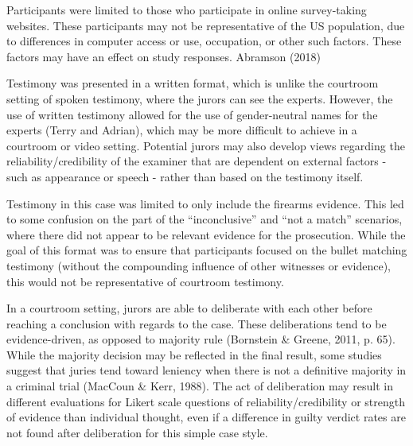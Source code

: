 \documentclass[print]{nuthesis}
\begin{document}
Participants were limited to those who participate in online survey-taking websites.
These participants may not be representative of the US population, due to differences in computer access or use, occupation, or other such factors.
These factors may have an effect on study responses.
Abramson (2018) 

Testimony was presented in a written format, which is unlike the courtroom setting of spoken testimony, where the jurors can see the experts.
However, the use of written testimony allowed for the use of gender-neutral names for the experts (Terry and Adrian), which may be more difficult to achieve in a courtroom or video setting.
Potential jurors may also develop views regarding the reliability/credibility of the examiner that are dependent on external factors - such as appearance or speech - rather than based on the testimony itself.

Testimony in this case was limited to only include the firearms evidence.
This led to some confusion on the part of the ``inconclusive'' and ``not a match'' scenarios, where there did not appear to be relevant evidence for the prosecution.
While the goal of this format was to ensure that participants focused on the bullet matching testimony (without the compounding influence of other witnesses or evidence), this would not be representative of courtroom testimony.

In a courtroom setting, jurors are able to deliberate with each other before reaching a conclusion with regards to the case.
These deliberations tend to be evidence-driven, as opposed to majority rule (Bornstein \& Greene, 2011, p. 65).
While the majority decision may be reflected in the final result, some studies suggest that juries tend toward leniency when there is not a definitive majority in a criminal trial (MacCoun \& Kerr, 1988).
The act of deliberation may result in different evaluations for Likert scale questions of reliability/credibility or strength of evidence than individual thought, even if a difference in guilty verdict rates are not found after deliberation for this simple case style.
\end{document}
